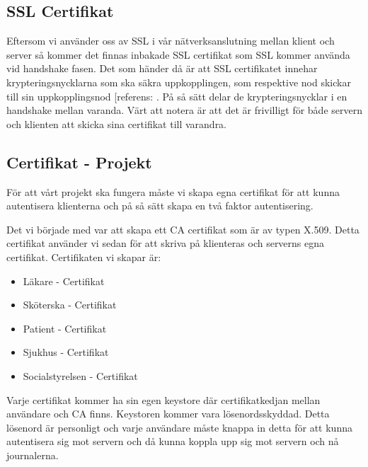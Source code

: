 \subsection{SSL Certifikat}
Eftersom vi använder oss av SSL i vår nätverksanslutning mellan klient och server så kommer det finnas inbakade SSL certifikat som SSL kommer använda vid handshake fasen. Det som händer då är att SSL certifikatet innehar krypteringsnycklarna som ska säkra uppkopplingen, som respektive nod skickar till sin uppkopplingsnod [referens: \cite{SSL}. På så sätt delar de krypteringsnycklar i en handshake mellan varanda. Värt att notera är att det är frivilligt för både servern och klienten att skicka sina certifikat till varandra.

\subsection{Certifikat - Projekt}
För att vårt projekt ska fungera måste vi skapa egna certifikat för att kunna autentisera klienterna och på så sätt skapa en två faktor autentisering. 

Det vi började med var att skapa ett CA certifikat som är av typen X.509. Detta certifikat använder vi sedan för att skriva på klienteras och serverns egna certifikat. Certifikaten vi skapar är:

\begin{itemize}
\item{Läkare - Certifikat}
\item{Sköterska - Certifikat}
\item{Patient - Certifikat}
\item{Sjukhus - Certifikat}
\item{Socialstyrelsen - Certifikat}
\end{itemize}

Varje certifikat kommer ha sin egen keystore där certifikatkedjan mellan användare och CA finns. Keystoren kommer vara lösenordsskyddad. Detta lösenord är personligt och varje användare måste knappa in detta för att kunna autentisera sig mot servern och då kunna koppla upp sig mot servern och nå journalerna. 